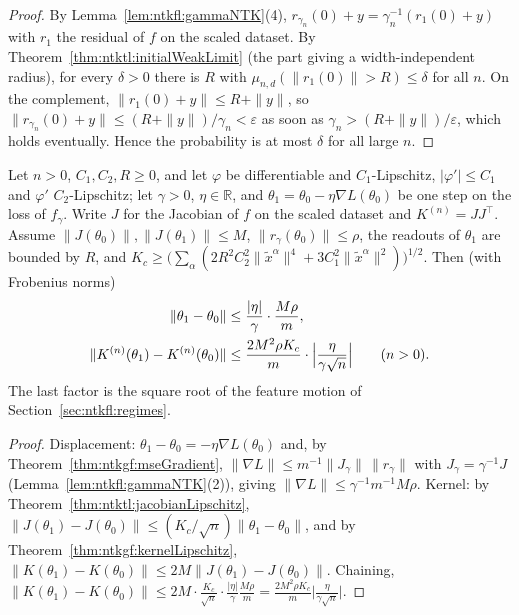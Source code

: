 \begin{proof}
  \leanok
By Lemma~\ref{lem:ntkfl:gammaNTK}(4), $r_{\gamma_n}(0)+y=\gamma_n^{-1}(r_1(0)+y)$ with $r_1$ the residual of $f$ on the scaled dataset. By Theorem~\ref{thm:ntktl:initialWeakLimit} (the part giving a width-independent radius), for every $\delta>0$ there is $R$ with
$\mu_{n,d}(\|r_1(0)\|>R)\le\delta$ for all $n$. On the complement, $\|r_1(0)+y\|\le R+\|y\|$, so $\|r_{\gamma_n}(0)+y\|\le(R+\|y\|)/\gamma_n<\varepsilon$ as soon as $\gamma_n>(R+\|y\|)/\varepsilon$, which holds eventually.
Hence the probability is at most $\delta$ for all large $n$.
\end{proof}

\begin{theorem}\label{thm:ntkfl:kernelDrift}
  \leanok
Let $n>0$, $C_1,C_2,R\ge0$, and let $\varphi$ be differentiable and $C_1$-Lipschitz, $|\varphi'|\le C_1$ and $\varphi'$ $C_2$-Lipschitz; let $\gamma>0$, $\eta\in\mathbb R$, and $\theta_1=\theta_0-\eta\nabla L(\theta_0)$ be one step on the loss of $f_\gamma$. Write $J$ for the Jacobian of $f$ on the scaled dataset and
$K^{(n)}=JJ^\top$. Assume $\|J(\theta_0)\|,\|J(\theta_1)\|\le M$, $\|r_\gamma(\theta_0)\|\le\rho$, the readouts of $\theta_1$ are bounded by $R$, and $K_c\ge\bigl(\sum_\alpha(2R^2C_2^2\|\tilde x^\alpha\|^4+3C_1^2\|\tilde x^\alpha\|^2)\bigr)^{1/2}$. Then (with Frobenius norms)
\begin{align*}
  \|\theta_1-\theta_0\|&\le\frac{|\eta|}{\gamma}\cdot\frac{M\rho}{m},\\
  \|K^{(n)}(\theta_1)-K^{(n)}(\theta_0)\|&\le\frac{2M^2\rho K_c}{m}\cdot\Bigl|\frac{\eta}{\gamma\sqrt n}\Bigr|\qquad(n>0).
\end{align*}
The last factor is the square root of the feature motion of Section~\ref{sec:ntkfl:regimes}.
\end{theorem}

\begin{proof}
  \leanok
Displacement: $\theta_1-\theta_0=-\eta\nabla L(\theta_0)$ and, by Theorem~\ref{thm:ntkgf:mseGradient}, $\|\nabla L\|\le m^{-1}\|J_\gamma\|\,\|r_\gamma\|$ with $J_\gamma=\gamma^{-1}J$ (Lemma~\ref{lem:ntkfl:gammaNTK}(2)), giving $\|\nabla L\|\le\gamma^{-1}m^{-1}M\rho$.
Kernel: by Theorem~\ref{thm:ntktl:jacobianLipschitz}, $\|J(\theta_1)-J(\theta_0)\|\le(K_c/\sqrt n)\|\theta_1-\theta_0\|$, and by Theorem~\ref{thm:ntkgf:kernelLipschitz}, $\|K(\theta_1)-K(\theta_0)\|\le2M\|J(\theta_1)-J(\theta_0)\|$. Chaining,
$\|K(\theta_1)-K(\theta_0)\|\le2M\cdot\frac{K_c}{\sqrt n}\cdot\frac{|\eta|}{\gamma}\frac{M\rho}m=\frac{2M^2\rho K_c}{m}\bigl|\frac{\eta}{\gamma\sqrt n}\bigr|$.
\end{proof}

